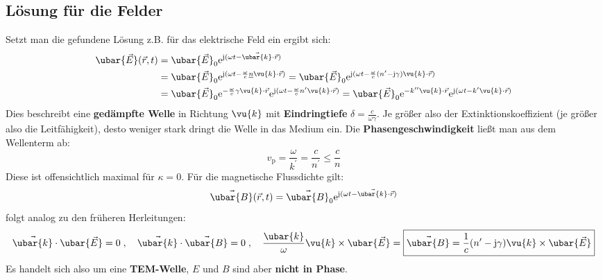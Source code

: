   \subsection{Lösung für die Felder}
		 Setzt man die gefundene Lösung z.B. für das elektrische Feld ein ergibt sich:
		        \begin{equation}\begin{split}
				        \ubar{\vec{E}}(\vec{r} , t) &= \ubar{\vec{E}}_0  \mathrm{e}^{\mathrm{j}(\omega t -  \vec{\ubar{k}}\cdot\vec{r} )}\\
				        &=\ubar{\vec{E}}_0  \mathrm{e}^{\mathrm{j}(\omega t - \frac{\omega}{c}\underline{n}\vu{k}\cdot\vec{r} )} = \ubar{\vec{E}}_0  \mathrm{e}^{\mathrm{j}(\omega t - \frac{\omega}{c}(n^{\prime}-\mathrm{j}\gamma)\vu{k}\cdot\vec{r} )}\\
				        &= \ubar{\vec{E}}_0 \mathrm{e}^{-\frac{\omega}{c}\gamma \vu{k}\cdot\vec{r} }  \mathrm{e}^{\mathrm{j}(\omega t - \frac{\omega}{c}n^{\prime}\vu{k}\cdot\vec{r} )} = \ubar{\vec{E}}_0 \mathrm{e}^{- k^{\prime\prime} \vu{k}\cdot\vec{r} }  \mathrm{e}^{\mathrm{j}(\omega t -  k^{\prime}\vu{k}\cdot\vec{r} )}
			        \end{split}\end{equation}
		  Dies beschreibt eine \textbf{gedämpfte Welle} in Richtung \(\vu{k} \) mit \textbf{Eindringtiefe} \(\delta = \frac{c}{\omega\gamma}\). Je größer also der Extinktionskoeffizient (je größer also die Leitfähigkeit), desto weniger stark dringt die Welle in das Medium ein. Die \textbf{Phasengeschwindigkeit} ließt man aus dem Wellenterm ab:
		        \begin{equation}
			        \boxed{ v_\mathrm{p} = \frac{\omega}{ k^{\prime}} = \frac{c}{n^{\prime}} \le \frac{c}{n}} 
		        \end{equation}
		   Diese ist offensichtlich maximal für $\kappa=0$. Für die magnetische Flussdichte gilt:
		        \begin{equation}
			        \vec{\ubar{B}}(\vec{r} , t) = \vec{\ubar{B}}_0  \mathrm{e}^{\mathrm{j}(\omega t -  \vec{\ubar{k}}\cdot\vec{r} )}
		        \end{equation}
		        folgt analog zu den früheren Herleitungen:
		        \begin{equation}
			        \vec{\ubar{k}}\cdot\ubar{\vec{E}} = 0 \; ,\quad  \vec{\ubar{k}}\cdot\vec{\ubar{B}} = 0 \; ,\quad \frac{ \ubar{k}}{\omega} \vu{k}\times \ubar{\vec{E}} = \boxed{\vec{\ubar{B}} = \frac{1}{c}(n^{\prime}-\mathrm{j}\gamma) \vu{k}\times \ubar{\vec{E}}}
		        \end{equation}
		        Es handelt sich also um eine \textbf{TEM-Welle}, $E$ und $B$ sind aber \textbf{nicht in Phase}.

